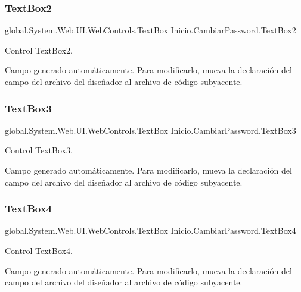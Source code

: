 \subsubsection{\texorpdfstring{TextBox2}{TextBox2}}
{\footnotesize\ttfamily global.\+System.\+Web.\+U\+I.\+Web\+Controls.\+Text\+Box Inicio.\+Cambiar\+Password.\+Text\+Box2\hspace{0.3cm}{\ttfamily [protected]}}



Control Text\+Box2. 

Campo generado automáticamente. Para modificarlo, mueva la declaración del campo del archivo del diseñador al archivo de código subyacente. \mbox{\label{class_inicio_1_1_cambiar_password_affa43c3fb9f3daacfb67965c2c50466f}} 
\subsubsection{\texorpdfstring{TextBox3}{TextBox3}}
{\footnotesize\ttfamily global.\+System.\+Web.\+U\+I.\+Web\+Controls.\+Text\+Box Inicio.\+Cambiar\+Password.\+Text\+Box3\hspace{0.3cm}{\ttfamily [protected]}}



Control Text\+Box3. 

Campo generado automáticamente. Para modificarlo, mueva la declaración del campo del archivo del diseñador al archivo de código subyacente. \mbox{\label{class_inicio_1_1_cambiar_password_a9365f80de4f65ec031a704d80d0b5c51}} 
\subsubsection{\texorpdfstring{TextBox4}{TextBox4}}
{\footnotesize\ttfamily global.\+System.\+Web.\+U\+I.\+Web\+Controls.\+Text\+Box Inicio.\+Cambiar\+Password.\+Text\+Box4\hspace{0.3cm}{\ttfamily [protected]}}



Control Text\+Box4. 

Campo generado automáticamente. Para modificarlo, mueva la declaración del campo del archivo del diseñador al archivo de código subyacente. \mbox{\label{class_inicio_1_1_cambiar_password_a852585bbaa846d9076125c13ca2ad786}} 
